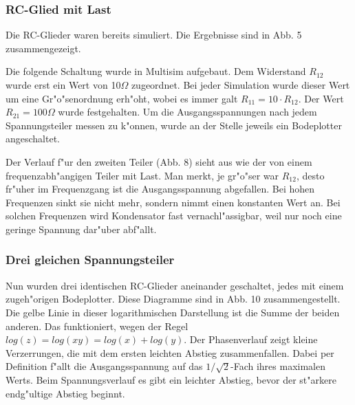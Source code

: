 \documentclass[10pt]{article}
\begin{document}
\subsubsection{RC-Glied mit Last}
Die RC-Glieder waren bereits simuliert. Die Ergebnisse sind in Abb. 5 zusammengezeigt.



Die folgende Schaltung wurde in Multisim aufgebaut. Dem Widerstand $R_{12}$ wurde erst ein Wert von 10$\Omega$ zugeordnet. Bei jeder Simulation wurde dieser Wert um eine Gr"o"senordnung erh"oht, wobei es immer galt $R_{11}=10 \cdot R_{12}$. Der Wert $R_{21} = 100\Omega$ wurde festgehalten. Um die Ausgangsspannungen nach jedem Spannungsteiler messen zu k"onnen, wurde an der Stelle jeweils ein Bodeplotter angeschaltet.

Der Verlauf f"ur den zweiten Teiler (Abb. 8) sieht aus wie der von einem frequenzabh"angigen Teiler mit Last. Man merkt, je gr"o"ser war $R_{12}$, desto fr"uher im Frequenzgang ist die Ausgangsspannung abgefallen. Bei hohen Frequenzen sinkt sie nicht mehr, sondern nimmt einen konstanten Wert an. Bei solchen Frequenzen wird Kondensator fast vernachl"assigbar, weil nur noch eine geringe Spannung dar"uber abf"allt. 

\subsubsection{Drei gleichen Spannungsteiler}
Nun wurden drei identischen RC-Glieder aneinander geschaltet, jedes mit einem zugeh"origen Bodeplotter. Diese Diagramme sind in Abb. 10 zusammengestellt. Die gelbe Linie in dieser logarithmischen Darstellung ist die Summe der beiden anderen. Das funktioniert, wegen der Regel $log(z)=log(xy)=log(x)+log(y)$. Der Phasenverlauf zeigt kleine Verzerrungen, die mit dem ersten leichten Abstieg zusammenfallen. Dabei per Definition f"allt die Ausgangsspannung auf das $1/\sqrt{2}$-Fach ihres maximalen Werts. Beim Spannungsverlauf es gibt ein leichter Abstieg, bevor der st"arkere endg"ultige Abstieg beginnt.





\end{document}
